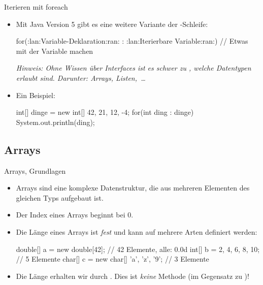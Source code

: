 \begin{frame}[fragile]{Iterieren mit foreach}
    \begin{itemize}[<+(1)->]
        \widei
        \item Mit Java Version 5 gibt es eine weitere Variante der -Schleife:\pause{}
\begin{plainjava}
for(:lan:Variable-Deklaration:ran: : :lan:Iterierbare Variable:ran:) {
    // Etwas mit der Variable machen
}
\end{plainjava}
        \pause{}\textit{Hinweis: Ohne Wissen über Interfaces ist es schwer zu , welche Datentypen erlaubt sind.\pause{} Darunter: Arrays, Listen,~\ldots}
        \item Ein Beispiel:\pause{}
\begin{plainjava}
int[] dinge = new int[] {42, 21, 12, -4};
for(int ding : dinge){
    System.out.println(ding);
}
\end{plainjava}
    \end{itemize}
\end{frame}

\subsection{Arrays}
\begin{frame}[fragile]{Arrays, Grundlagen}
    \begin{itemize}[<+(1)->]
        \widei
        \item Arrays sind eine komplexe Datenstruktur,\pause{} die aus mehreren Elementen des gleichen Typs aufgebaut ist.
        \item Der Index eines Arrays beginnt bei \(0\).
        \item Die Länge eines Arrays ist \emph{fest}\pause{} und kann auf mehrere Arten definiert werden:\pause{}
\begin{plainjava}
double[] a = new double[42]; // 42 Elemente, alle: 0.0d
int[] b = {2, 4, 6, 8, 10}; // 5 Elemente
char[] c = new char[] {'a', 'z', '9'}; // 3 Elemente
\end{plainjava}
        \item Die Länge erhalten wir durch .\pause{} Dies ist \emph{keine} Methode (im Gegensatz zu )!
    \end{itemize}
\end{frame}

